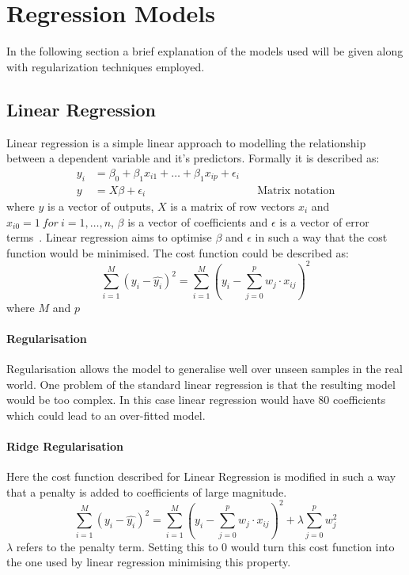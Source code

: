 \documentclass{article}
\begin{document}
\section{Regression Models}
In the following section a brief explanation of the models used will be given along with regularization techniques employed.
\subsection{Linear Regression}
Linear regression is a simple linear approach to modelling the relationship between a dependent variable and it's predictors. Formally it is described as:
\begin{align}
    y_i &= \beta_0 + \beta_1x_{i1} + \dots + \beta_1x_{ip} + \epsilon_i \\
    y &= X\beta + \epsilon_i && \text{Matrix notation}
\end{align}{}
where \(y\) is a vector of outputs, \(X\) is a matrix of row vectors \(x_i\) and \(x_{i0} = 1~for~i=1,\dots,n\), \(\beta\) is a vector of coefficients and \(\epsilon\) is a vector of error terms~\autocite{hastie2009elements}. Linear regression aims to optimise \(\beta\) and \(\epsilon\) in such a way that the cost function would be minimised. The cost function could be described as:
\begin{equation}
    \sum_{i=1}^M (y_i-\hat{y_i})^2 = \sum^M_{i=1}\left(y_i-\sum^p_{j=0}w_j \cdot x_{ij}\right)^2
\end{equation}{} where \(M\) and \(p\)
\paragraph{Regularisation} Regularisation allows the model to generalise well over unseen samples in the real world. One problem of the standard linear regression is that the resulting model would be too complex. In this case linear regression would have 80 coefficients which could lead to an over-fitted model.
\paragraph{Ridge Regularisation} Here the cost function described for Linear Regression is modified in such a way that a penalty is added to coefficients of large magnitude.
\begin{equation}
    \sum_{i=1}^M (y_i-\hat{y_i})^2 = \sum^M_{i=1}\left(y_i-\sum^p_{j=0}w_j \cdot x_{ij}\right)^2 + \lambda\sum^p_{j=0}w^2_j
\end{equation}{}
\(\lambda\) refers to the penalty term. Setting this to 0 would turn this cost function into the one used by linear regression minimising this property.
\end{document}
